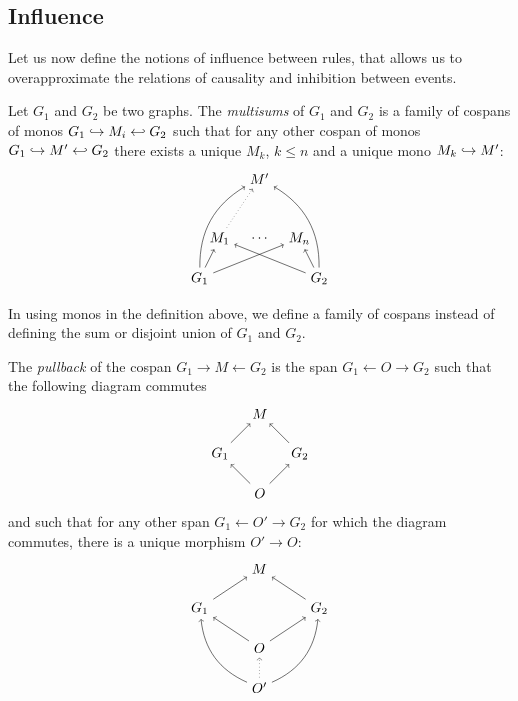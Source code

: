 \subsection{Influence}
\label{sec:infl}

Let us now define the notions of influence between rules, that allows us to overapproximate the relations of causality and inhibition between events.

\begin{definition}
  Let $G_1$ and $G_2$ be two graphs. The \emph{multisums} of $G_1$ and $G_2$ is a family of cospans of monos $G_1\hookrightarrow M_i\hookleftarrow G_2$ such that for any other cospan of monos $G_1\hookrightarrow M'\hookleftarrow G_2$ there exists a unique $M_k$, $k\leq n$ and a unique mono $M_k\hookrightarrow M'$:
  \[
  \begin{tikzpicture} %
    \node (l1) at (-1.5,0) {\(G_1\)};
    \node (l2) at (1.5,0) {\(G_2\)};
    \node (m1) at (-1,1) {\(M_1\)};
    \node (m2) at (0,1) {\(\cdots\)};
    \node (mn) at (1,1) {\(M_n\)};
    \node (n) at (0,2.5) {\(M'\)};
    \draw [->] (l1) -- (m1);
    \draw [->] (l2) -- (m1);
    \draw [->] (l1) -- (mn);
    \draw [->] (l2) -- (mn);
    \draw [->] (l1) to [bend left] (n);
    \draw [->] (l2) to [bend right] (n);
    \draw [->, dotted] (m1) -- (n);
  \end{tikzpicture}
  \]
\end{definition}

\begin{remark}
  In using monos in the definition above, we define a family of cospans instead of defining the sum or disjoint union of $G_1$ and $G_2$.
\end{remark}

\begin{definition}[Pullback]
  The \emph{pullback} of the cospan $G_1\rightarrow M\leftarrow G_2$ is the span $G_1\leftarrow O\rightarrow G_2$ such that the following diagram commutes
  \[
  \begin{tikzpicture} %
    \node (o) at (0,-1) {\(O\)};
    \node (l1) at (-1,0) {\(G_1\)};
    \node (l2) at (1,0) {\(G_2\)};
    \node (m) at (0,1) {\(M\)};
    \draw [->] (o) --  (l1);
    \draw [->] (o) --  (l2);
    \draw [->] (l1) --  (m);
    \draw [->] (l2) --  (m);
  \end{tikzpicture}
  \]
  and such that for any other span $G_1\leftarrow O'\rightarrow G_2$ for which the diagram commutes, there is a unique morphism $O'\to O$:
  \[
  \begin{tikzpicture} %
    \node (o) at (0,-1) {\(O\)};
    \node (l1) at (-1.5,0) {\(G_1\)};
    \node (l2) at (1.5,0) {\(G_2\)};
    \node (m) at (0,1) {\(M\)};
    \node (n) at (0,-2) {\(O'\)};
    \draw [->] (o) --  (l1);
    \draw [->] (o) --  (l2);
    \draw [->] (l1) --  (m);
    \draw [->] (l2) --  (m);
    \draw [->] (n) to [bend left] (l1);
    \draw [->] (n) to [bend right] (l2);
    \draw [->, dotted] (n) -- (o);
  \end{tikzpicture}
  \]
\end{definition}

